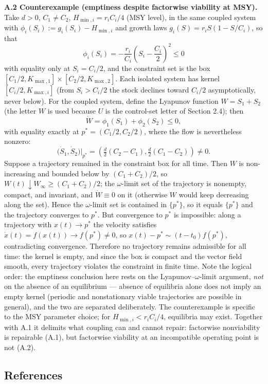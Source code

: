 \documentclass[11pt]{article}
\begin{document}
\textbf{A.2 Counterexample (emptiness despite factorwise viability at
MSY).} Take \(d > 0\), \(C_1 \ne C_2\), \(H_{\min,i} = r_i C_i / 4\)
(MSY level), in the same coupled system with
\(\phi_i(S_i) := g_i(S_i) - H_{\min,i}\) and growth laws
\(g_i(S) = r_i S (1 - S/C_i)\), so that
\[\phi_i(S_i) = -\frac{r_i}{C_i}\left(S_i - \frac{C_i}{2}\right)^2 \le 0\]
with equality only at \(S_i = C_i/2\), and the constraint set is the box
\([C_1/2, K_{\max,1}] \times [C_2/2, K_{\max,2}]\). Each isolated system
has kernel \([C_i/2, K_{\max,i}]\) (from \(S_i > C_i/2\) the stock
declines toward \(C_i/2\) asymptotically, never below). For the coupled
system, define the Lyapunov function \(W = S_1 + S_2\) (the letter \(W\)
is used because \(U\) is the control-set letter of Section 2.4); then
\[\dot W = \phi_1(S_1) + \phi_2(S_2) \le 0,\] with equality exactly at
\(p^* = (C_1/2, C_2/2)\), where the flow is nevertheless nonzero:
\[\big(\dot S_1, \dot S_2\big)\big|_{p^*} = \left(\tfrac{d}{2}(C_2 - C_1), \tfrac{d}{2}(C_1 - C_2)\right) \ne 0.\]
Suppose a trajectory remained in the constraint box for all time. Then
\(W\) is non-increasing and bounded below by \((C_1 + C_2)/2\), so
\(W(t) \downarrow W_\infty \ge (C_1 + C_2)/2\); the \(\omega\)-limit set
of the trajectory is nonempty, compact, and invariant, and
\(\dot W \equiv 0\) on it (otherwise \(W\) would keep decreasing along
the set). Hence the \(\omega\)-limit set is contained in \(\{p^*\}\), so
it equals \(\{p^*\}\) and the trajectory converges to \(p^*\). But
convergence to \(p^*\) is impossible: along a trajectory with
\(x(t) \to p^*\) the velocity satisfies
\(\dot x(t) = f(x(t)) \to f(p^*) \ne 0\), so
\(x(t) - p^* \sim (t - t_0) f(p^*)\), contradicting convergence.
Therefore no trajectory remains admissible for all time: the kernel is
empty, and since the box is compact and the vector field smooth, every
trajectory violates the constraint in finite time. Note the logical
order: the emptiness conclusion here rests on the
Lyapunov--\(\omega\)-limit argument, \emph{not} on the absence of an
equilibrium --- absence of equilibria alone does not imply an empty
kernel (periodic and nonstationary viable trajectories are possible in
general), and the two are separated deliberately. The counterexample is
specific to the MSY parameter choice; for \(H_{\min,i} < r_i C_i / 4\),
equilibria may exist. Together with A.1 it delimits what coupling can
and cannot repair: factorwise nonviability is repairable (A.1), but
factorwise viability at an incompatible operating point is not (A.2).

\subsection{References}\label{references}
\end{document}
